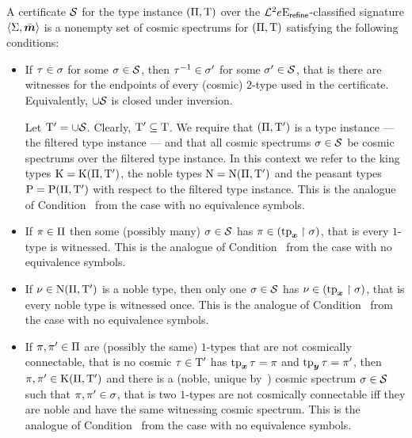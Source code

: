 \begin{definition}
A certificate $\mathcal{S}$ for the type instance $(\Pi,\mathrm{T})$ over the
$\mathcal{L}^{2}{e}\mathrm{E}_{\mathsf{refine}}$-classified signature $\left\langle \mathrm{\Sigma},\bar{\bm{m}} \right\rangle$ is a nonempty
set of cosmic spectrums for $(\Pi,\mathrm{T})$ satisfying the following
conditions:
\begin{itemize}
  \item[\certcondIp]\label{cond:cert-Ip}
  If $\tau \in \sigma$ for some $\sigma \in \mathcal{S}$, then
  $\tau^{-1} \in {\sigma'}$ for some ${\sigma'} \in \mathcal{S}$, that is there are
  witnesses for the endpoints of every (cosmic) $2$-type used in the
  certificate. Equivalently, $\cup\mathcal{S}$ is closed under inversion.
  
  Let ${\mathrm{T}'} = \cup\mathcal{S}$. Clearly, ${\mathrm{T}'} \subseteq \mathrm{T}$. We require that
  $(\Pi,{\mathrm{T}'})$ is a type instance --- the filtered type instance --- and
  that all cosmic spectrums $\sigma \in \mathcal{S}$ be cosmic spectrums over the
  filtered type instance. In this context we refer to the king types $\mathrm{K} =
  \mathrm{K}(\Pi,{\mathrm{T}'})$, the noble types $\mathrm{\mathrm{N}} = \mathrm{\mathrm{N}}(\Pi,{\mathrm{T}'})$ and the peasant
  types $\mathrm{P} = \mathrm{P}(\Pi,{\mathrm{T}'})$ with respect to the filtered type instance.
  This is the analogue of Condition~ from the case with no
  equivalence symbols.
  \item[\certcondIIp]\label{cond:cert-IIp}
  If $\pi \in \Pi$ then some (possibly many) $\sigma
  \in \mathcal{S}$ has $\pi \in (\operatorname{tp}_{\bm{x}}\restriction\sigma)$, that is every
  $1$-type is witnessed. This is the analogue of
  Condition~ from the case with no equivalence symbols.
  \item[\certcondIIIp]\label{cond:cert-IIIp}
  If $\nu \in \mathrm{\mathrm{N}}(\Pi,{\mathrm{T}'})$ is a noble type, then only one $\sigma \in
  \mathcal{S}$ has $\nu \in (\operatorname{tp}_{\bm{x}}\restriction\sigma)$, that is every noble type is
  witnessed once. This is the analogue of Condition~ from the case
  with no equivalence symbols.
  \item[\certcondIVp]\label{cond:cert-IVp}
  If $\pi,{\pi'} \in \Pi$ are (possibly the same) $1$-types that are not
  cosmically connectable, that is no cosmic $\tau \in {\mathrm{T}'}$ has $\operatorname{tp}_{\bm{x}}\tau =
  \pi$ and $\operatorname{tp}_{\bm{y}}\tau = {\pi'}$, then $\pi, {\pi'} \in \mathrm{K}(\Pi,{\mathrm{T}'})$ and
  there is a (noble, unique by~) cosmic spectrum $\sigma \in
  \mathcal{S}$ such that $\pi, {\pi'} \in \sigma$, that is two $1$-types are not cosmically
  connectable iff they are noble and have the same witnessing cosmic spectrum.
  This is the analogue of Condition~ from the case with no
  equivalence symbols.
\end{itemize}
\end{definition}
